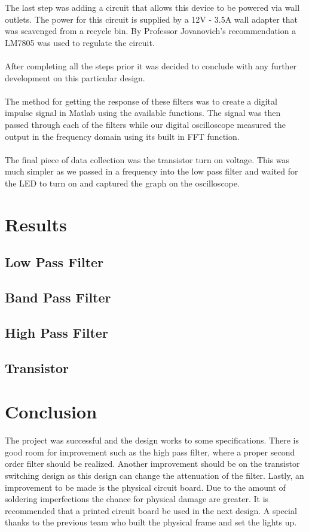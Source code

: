 \documentclass[12pt,a4paper]{article}
\begin{document}
The last step was adding a circuit that allows this device to be powered via wall outlets. The power for this circuit is supplied by a 12V - 3.5A wall adapter that was scavenged from a recycle bin. By Professor Jovanovich's recommendation a LM7805 was used to regulate the circuit.
\\ \\
After completing all the steps prior it was decided to conclude with any further development on this particular design.
\\ \\
The method for getting the response of these filters was to create a digital impulse signal in Matlab using the available functions. The signal was then passed through each of the filters while our digital oscilloscope measured the output in the frequency domain using its built in FFT function. 
\\ \\ 
The final piece of data collection was the transistor turn on voltage. This was much simpler as we passed in a frequency into the low pass filter and waited for the LED to turn on and captured the graph on the oscilloscope. 

    \newpage
    \section*{Results}
    \subsection*{Low Pass Filter}
    
    \subsection*{Band Pass Filter}
    
    \subsection*{High Pass Filter}
    
    \subsection*{Transistor}
    

    \newpage
    \section*{Conclusion}
        The project was successful and the design works to some specifications. There is good room for improvement such as the high pass filter, where a proper second order filter should be realized. Another improvement should be on the transistor switching design as this design can change the attenuation of the filter. Lastly, an improvement to be made is the physical circuit board. Due to the amount of soldering imperfections the chance for physical damage are greater. It is recommended that a printed circuit board be used in the next design. A special thanks to the previous team who built the physical frame and set the lights up.
\end{document}
